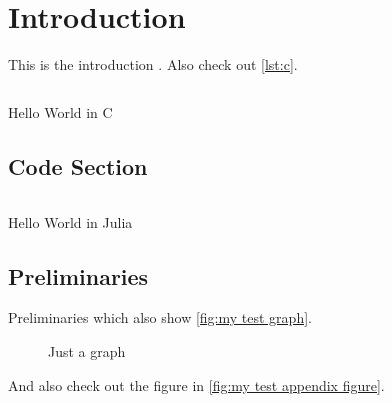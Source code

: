 \chapter{Introduction}
\label{chp:introduction}

This is the introduction \cite{latex2e}.
Also check out \autoref{lst:c}.

\begin{listing}
    \inputminted{c}{assets/listings/hello.c}
    \caption{Hello World in C}
    \label{lst:c}
\end{listing}


\section{Code Section}\label{sec:code-section}

\begin{listing}
    \inputminted{julia}{assets/listings/hello.jl}
    \caption{Hello World in Julia}
    \label{lst:julia}
\end{listing}

\section{Preliminaries}
\label{sec:preliminaries}

Preliminaries which also show \autoref{fig:my test graph}.

\begin{figure}
    \centering
    \caption{Just a graph}
    \label{fig:my test graph}
\end{figure}


And also check out the figure in \autoref{fig:my test appendix figure}.